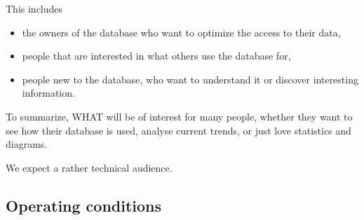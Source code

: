 This includes
\begin{itemize}
  \item the owners of the database who want to optimize the access to
  	their data,
  	
  \item people that are interested in what others use the database for,

  
  \item people new to the database, who want to understand it or discover interesting information.

\end{itemize}
To summarize, WHAT will be of interest for many people, 
whether they want to see how their database is used, analyse current trends,
or just love statistics and diagrams.

%   
%   




We expect a rather technical audience.
 
 

\subsection{Operating conditions}

